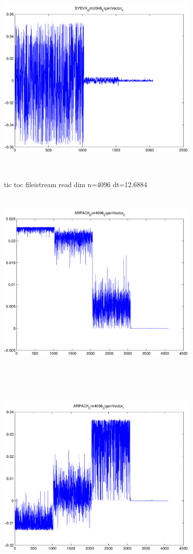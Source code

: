 \documentclass[9pt]{article}
\theoremstyle{plain}
\theoremstyle{definition}
\theoremstyle{remark}
\numberwithin{equation}{section}
\begin{document}
\includegraphics[width=10.0cm,height=10.0cm]{SYEVX_Dim2048_EigenVector_4.pdf}

tic toc fileistream read dim n=4096 dt=12.6884
\includegraphics[width=10.0cm,height=10.0cm]{ARPACK_Dim4096_EigenVector_0.pdf}

\includegraphics[width=10.0cm,height=10.0cm]{ARPACK_Dim4096_EigenVector_1.pdf}
\end{document}
